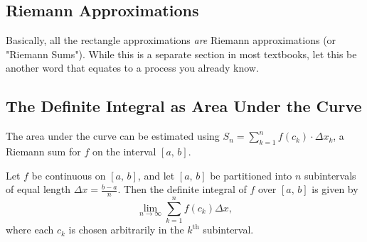 \documentclass[addpoints, 12pt]{exam}
\begin{document}

\subsection*{Riemann Approximations}
Basically, all the rectangle approximations \textit{are} Riemann approximations (or "Riemann Sums"). While this is a separate section in most textbooks, let this be another word that equates to a process you already know.



\newpage
{}
\subsection*{The Definite Integral as Area Under the Curve}

\begin{center}
\end{center}

The area under the curve can be estimated using $\displaystyle S_n=\sum_{k=1}^n f\left(c_k\right)\cdot\Delta x_k$, a Riemann sum for $f$ on the interval $[a,\,b].$

\begin{tcolorbox}[title= LIMIT DEFINITION OF THE DEFINITE INTEGRAL,colframe=black,sharp corners,colback=white,colbacktitle=white,coltitle=black,boxrule=1pt]

     Let $f$ be continuous on $[a,\,b]$, and let $[a,\,b]$ be partitioned into $n$ subintervals of equal length $\displaystyle \Delta x=\frac{b-a}{n}$. Then the definite integral of $f$ over $[a,\,b]$ is given by
     \[\lim_{n\to\infty}\sum_{k=1}^n f\left(c_k\right)\Delta x,\]
     where each $c_k$ is chosen arbitrarily in the $k^{\text{th}}$ subinterval.
    
\end{tcolorbox}
\end{document}
